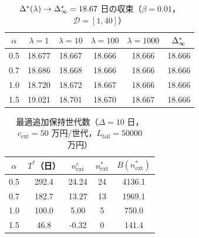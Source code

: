 \begin{table}[htbp]
\centering
\caption{$\Delta^\ast(\lambda)\to\Delta_\infty^\ast=18.67$ 日の収束（$\beta=0.01$，$\mathcal{D}=[1,40]$）}
\begin{tabular}{cccccc}
\toprule
$\alpha$ & $\lambda=1$ & $\lambda=10$ & $\lambda=100$ & $\lambda=1000$ & $\Delta_\infty^\ast$\\
\midrule
0.5 & 18.677 & 18.667 & 18.666 & 18.666 & 18.666\\
0.7 & 18.686 & 18.668 & 18.666 & 18.666 & 18.666\\
1.0 & 18.720 & 18.672 & 18.667 & 18.666 & 18.666\\
1.5 & 19.021 & 18.701 & 18.670 & 18.667 & 18.666\\
\bottomrule
\end{tabular}
\end{table}

\begin{table}[htbp]
\centering
\caption{最適追加保持世代数（$\Delta=10$ 日，$c_{\mathrm{ext}}=50$ 万円/世代，$L_{\mathrm{fail}}=50000$ 万円）}
\begin{tabular}{ccccc}
\toprule
$\alpha$ & $T^\ast$（日） & $n_{\mathrm{ext}}^c$ & $n_{\mathrm{ext}}^\ast$ & $B(n_{\mathrm{ext}}^\ast)$\\
\midrule
0.5 & 292.4 & 24.24 & 24 & 4136.1\\
0.7 & 182.7 & 13.27 & 13 & 1969.1\\
1.0 & 100.0 & 5.00 & 5 & 750.0\\
1.5 & 46.8 & -0.32 & 0 & 141.4\\
\bottomrule
\end{tabular}
\end{table}
